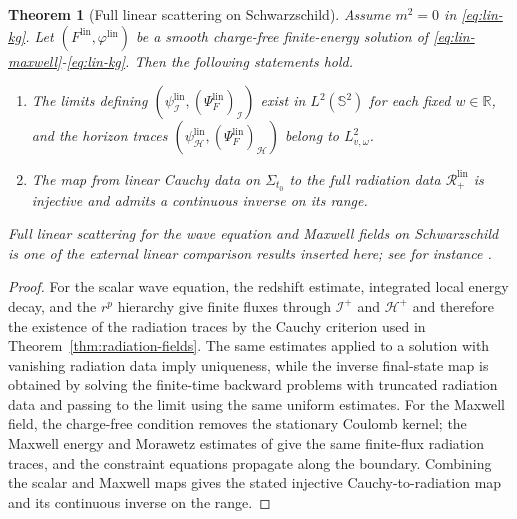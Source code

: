 \documentclass[11pt]{article}
\numberwithin{equation}{section}
\theoremstyle{plain}
\newtheorem{theorem}{Theorem}[section]
\theoremstyle{definition}
\theoremstyle{remark}
\begin{document}
\begin{theorem}[Full linear scattering on Schwarzschild]\label{thm:linear-scattering}
Assume $m^{2}=0$ in \eqref{eq:lin-kg}.
Let $(F^{\mathrm{lin}},\varphi^{\mathrm{lin}})$ be a smooth charge-free finite-energy solution of \eqref{eq:lin-maxwell}-\eqref{eq:lin-kg}.
Then the following statements hold.
\begin{enumerate}
\item[(i)] The limits defining $(\psi_{\mathcal I}^{\mathrm{lin}},(\Psi_F^{\mathrm{lin}})_{\mathcal I})$ exist in $L^2(\mathbb S^2)$ for each fixed $w\in\mathbb R$, and the horizon traces $(\psi_{\mathcal H}^{\mathrm{lin}},(\Psi_F^{\mathrm{lin}})_{\mathcal H})$ belong to $L^{2}_{v,\omega}$.
\item[(ii)] The map from linear Cauchy data on $\Sigma_{t_0}$ to the full radiation data $\mathcal R_{+}^{\mathrm{lin}}$ is injective and admits a continuous inverse on its range.
\end{enumerate}
Full linear scattering for the wave equation and Maxwell fields on Schwarzschild is one of the external linear comparison results inserted here; see for instance \cite{dafermos,Blue,Ander1}.
\end{theorem}

\begin{proof}
For the scalar wave equation, the redshift estimate, integrated local energy decay, and the $r^p$ hierarchy give finite fluxes through $\mathcal I^+$ and $\mathcal H^+$ and therefore the existence of the radiation traces by the Cauchy criterion used in Theorem~\ref{thm:radiation-fields}.  The same estimates applied to a solution with vanishing radiation data imply uniqueness, while the inverse final-state map is obtained by solving the finite-time backward problems with truncated radiation data and passing to the limit using the same uniform estimates.  For the Maxwell field, the charge-free condition removes the stationary Coulomb kernel; the Maxwell energy and Morawetz estimates of \cite{Blue,Ander1} give the same finite-flux radiation traces, and the constraint equations propagate along the boundary.  Combining the scalar and Maxwell maps gives the stated injective Cauchy-to-radiation map and its continuous inverse on the range.
\end{proof}
\end{document}
